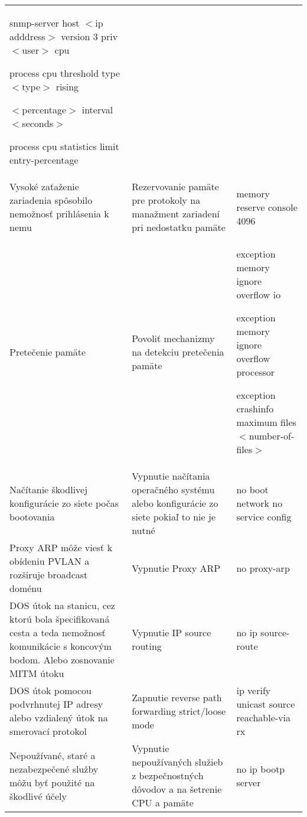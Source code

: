 \begin{longtable}[!htbp]{|L{10em}L{10em}>{\selectfont}L{34em}|}
	snmp-server host $<$ip adddress$>$ version 3 priv $<$user$>$ cpu
	
	process cpu threshold type $<$type$>$ rising 
	
	\hspace{0.5em}$<$percentage$>$ interval $<$seconds$>$
	
	process cpu statistics limit entry-percentage\\
	
	
	
	 Vysoké zaťaženie zariadenia spôsobilo nemožnosť prihlásenia k nemu	&Rezervovanie pamäte pre protokoly na manažment zariadení pri nedostatku pamäte	&memory reserve console 4096\\
	
	
	
	Pretečenie pamäte	&Povoliť mechanizmy na detekciu pretečenia pamäte	&exception memory ignore overflow io
	
	exception memory ignore overflow processor
	
	exception crashinfo maximum files $<$number-of-files$>$\\
	
	
	
	
	Načítanie škodlivej konfigurácie zo siete počas bootovania	&Vypnutie načítania operačného systému alebo konfigurácie zo siete pokiaľ to nie je nutné	&no boot network
	no service config\\
	
	
	
	
	Proxy ARP môže viesť k obídeniu PVLAN a rozširuje broadcast doménu	&Vypnutie Proxy ARP	&no proxy-arp\\
	
	
	
	DOS útok na stanicu, cez ktorú bola špecifikovaná cesta a teda nemožnosť komunikácie s koncovým bodom. Alebo zosnovanie MITM útoku	&Vypnutie IP source routing	&no ip source-route\\
	
	
	
	
	DOS útok pomocou podvrhnutej IP adresy alebo vzdialený útok na smerovací protokol	&Zapnutie reverse path forwarding strict/loose mode	&ip verify unicast source reachable-via rx\\
	
	
	
	 Nepoužívané, staré a nezabezpečené služby môžu byť použité na škodlivé účely	&Vypnutie nepoužívaných služieb z bezpečnostných dôvodov a na šetrenie CPU a pamäte 	&no ip bootp server\\
	

\end{longtable}
